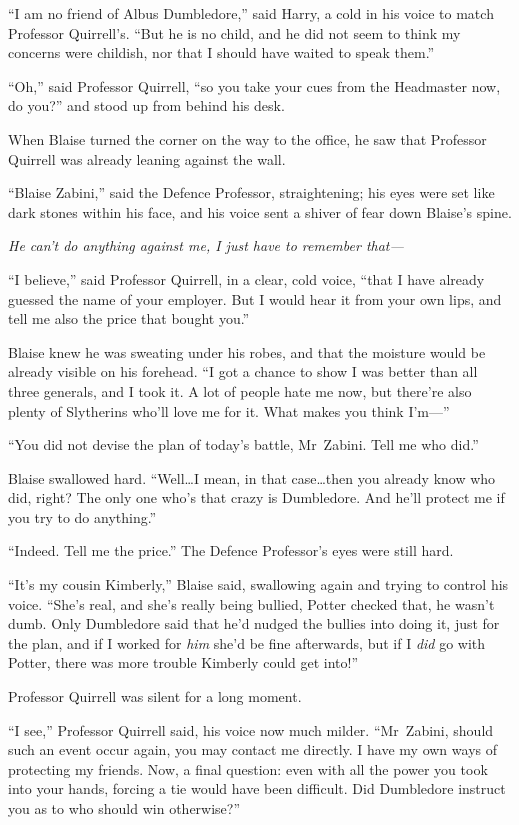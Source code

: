 “I am no friend of Albus Dumbledore,” said Harry, a cold in his voice to match Professor Quirrell’s. “But he is no child, and he did not seem to think my concerns were childish, nor that I should have waited to speak them.”

“Oh,” said Professor Quirrell, “so you take your cues from the Headmaster now, do you?” and stood up from behind his desk.

\later

When Blaise turned the corner on the way to the office, he saw that Professor Quirrell was already leaning against the wall.

“Blaise Zabini,” said the Defence Professor, straightening; his eyes were set like dark stones within his face, and his voice sent a shiver of fear down Blaise’s spine.

\emph{He can’t do anything against me, I just have to remember that—}

“I believe,” said Professor Quirrell, in a clear, cold voice, “that I have already guessed the name of your employer. But I would hear it from your own lips, and tell me also the price that bought you.”

Blaise knew he was sweating under his robes, and that the moisture would be already visible on his forehead. “I got a chance to show I was better than all three generals, and I took it. A lot of people hate me now, but there’re also plenty of Slytherins who’ll love me for it. What makes you think I’m—”

“You did not devise the plan of today’s battle, Mr~Zabini. Tell me who did.”

Blaise swallowed hard. “Well…I mean, in that case…then you already know who did, right? The only one who’s that crazy is Dumbledore. And he’ll protect me if you try to do anything.”

“Indeed. Tell me the price.” The Defence Professor’s eyes were still hard.

“It’s my cousin Kimberly,” Blaise said, swallowing again and trying to control his voice. “She’s real, and she’s really being bullied, Potter checked that, he wasn’t dumb. Only Dumbledore said that he’d nudged the bullies into doing it, just for the plan, and if I worked for \emph{him} she’d be fine afterwards, but if I \emph{did} go with Potter, there was more trouble Kimberly could get into!”

Professor Quirrell was silent for a long moment.

“I see,” Professor Quirrell said, his voice now much milder. “Mr~Zabini, should such an event occur again, you may contact me directly. I have my own ways of protecting my friends. Now, a final question: even with all the power you took into your hands, forcing a tie would have been difficult. Did Dumbledore instruct you as to who should win otherwise?”

